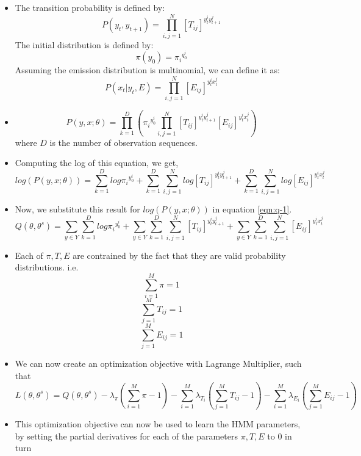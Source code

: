 \documentclass[parskip=half]{scrartcl}
\begin{document}
\begin{itemize}
        \item 
        The transition probability is defined by:
        $$P(y_t,y_{t+1}) = \prod^N_{i,j = 1} [T_{ij}]^{y_t^iy_{t+1}^j} $$
        The initial distribution is defined by:
        $$\pi(y_0) = {\pi_i}^{q_0^i} $$
        Assuming the emission distribution is multinomial, we can define it as:
        $$P(x_t|y_t, E) = \prod^N_{i,j = 1} [E_{ij}]^{y_t^ix_t^j} $$
        \item 
        \begin{equation*}
            P(y,x; \theta) = \prod^D_{k=1} ({\pi_i}^{y_0^i} \prod^N_{i,j=1} [T_{ij}]^{y_t^iy_{t+1}^j} [E_{ij}]^{y_t^ix_t^j} )
        \end{equation*}
        where $D$ is the number of observation sequences.
        \item 
        Computing the log of this equation, we get,
        \begin{equation*}
            log(P(y,x; \theta)) = \sum^D_{k=1} log {\pi_i}^{y_0^i} + \sum^D_{k=1}\sum^N_{i,j=1} log [T_{ij}]^{y_t^iy_{t+1}^j} + \sum^D_{k=1}\sum^N_{i,j=1} log [E_{ij}]^{y_t^ix_t^j} 
        \end{equation*}
        \item 
        Now, we substitute this result for $log(P(y,x; \theta))$ in equation \ref{eqn:q-1}.
        \begin{equation*}
            Q(\theta, \theta^s) = \sum_{y \in Y} \sum^D_{k=1} log {\pi_i}^{y_0^i} + \sum_{y \in Y} \sum^D_{k=1}\sum^N_{i,j=1} [T_{ij}]^{y_t^iy_{t+1}^j} + \sum_{y \in Y} \sum^D_{k=1}\sum^N_{i,j=1} [E_{ij}]^{y_t^ix_t^j} 
        \end{equation*}
        \item 
        Each of $\pi, T, E$ are contrained by the fact that they are valid probability distributions. i.e.
        \begin{equation*}
            \sum^M_{i=1} \pi = 1
        \end{equation*}
        \begin{equation*}
            \sum^M_{j=1} T_{ij} = 1
        \end{equation*}
        \begin{equation*}
            \sum^M_{j=1} E_{ij} = 1
        \end{equation*}
        \item 
        We can now create an optimization objective with Lagrange Multiplier, such that
        \begin{equation} \label{eqn:optimization-objective}
            L(\theta, \theta^s) = Q(\theta, \theta^s) - \lambda_{\pi} (\sum^M_{i=1} \pi - 1) - \sum^M_{i=1} \lambda_{T_i} (\sum^M_{j=1} T_{ij} - 1) - \sum^M_{i=1} \lambda_{E_i} (\sum^M_{j=1} E_{ij} - 1)
        \end{equation}
        \item 
        This optimization objective can now be used to learn the HMM parameters, by setting the partial derivatives for each of the parameters $\pi, T, E$ to 0 in turn 
    \end{itemize}
\end{document}
